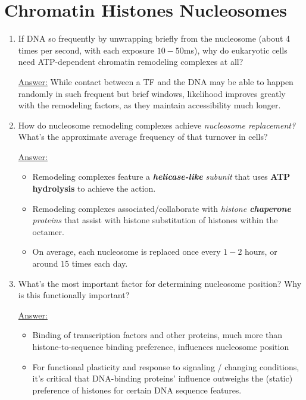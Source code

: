 \documentclass{article}
\newenvironment{QandA}{\begin{enumerate}[label=\bfseries Q\arabic*.]}
                       {\end{enumerate}}
\newenvironment{answered}{\par\normalfont\underline{Answer:}}{}
\begin{document}
\section{Chromatin Histones Nucleosomes}
\begin{QandA}
  \item{If DNA so frequently  by unwrapping briefly from the nucleosome (about 4 times per second, with each exposure $10-50$ms), why do eukaryotic cells need ATP-dependent chromatin remodeling complexes at all?}
    \begin{answered}
    While contact between a TF and the DNA may be able to happen randomly in such frequent but brief windows, likelihood improves greatly with the remodeling factors, as they maintain accessibility much longer.
    \end{answered}
  \item{How do nucleosome remodeling complexes achieve \textit{nucleosome replacement?} What's the approximate average frequency of that turnover in cells?}
    \begin{answered}
    \begin{itemize}
      \item{Remodeling complexes feature a \textit{\textbf{helicase-like} subunit} that uses \textbf{ATP hydrolysis} to achieve the  action.}
      \item{Remodeling complexes associated/collaborate with \textit{histone \textbf{chaperone} proteins} that assist with histone substitution of histones within the octamer.}
      \item{On average, each nucleosome is replaced once every $1-2$ hours, or around $15$ times each day.}
    \end{itemize}
    \end{answered}
  \item{What's the most important factor for determining nucleosome position? Why is this functionally important?}
    \begin{answered}
    \begin{itemize}
      \item{Binding of transcription factors and other proteins, much more than histone-to-sequence binding preference, influences nucleosome position}
      \item{For functional plasticity and response to signaling / changing conditions, it's critical that DNA-binding proteins' influence outweighs the (static) preference of histones for certain DNA sequence features.}
    \end{itemize}

\end{answered}
\end{QandA}
\end{document}
